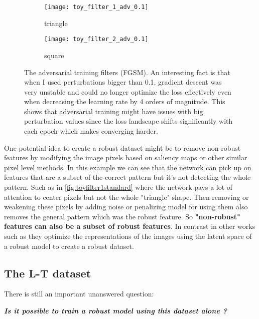 \documentclass[../thesis.tex]{subfiles}
\begin{document}
	\begin{figure}[h!]
		\centering
		\begin{subfigure}{.5\textwidth}
			\centering
			\texttt{[image: toy\_filter\_1\_adv\_0.1]}
			\caption{triangle}
			\label{fig:toyfilter1adv0}
		\end{subfigure}%
		\begin{subfigure}{.5\textwidth}
			\centering
			\texttt{[image: toy\_filter\_2\_adv\_0.1]}
			\caption{square}
			\label{fig:toyfilter2adv0}
		\end{subfigure}
		\caption{The adversarial training filters (FGSM). An interesting fact is that when I used perturbations bigger than 0.1, gradient descent was very unstable and could no longer optimize the loss effectively even when decreasing the learning rate by 4 orders of magnitude. This shows that adversarial training might have issues with big perturbation values since the loss landscape shifts significantly with each epoch which makes converging harder.}
		\label{fig:toy_adv_training_filters}
	\end{figure}
	
	
	One potential idea to create a robust dataset might be to remove non-robust features by modifying the image pixels based on saliency maps or other similar pixel level methods. In this example we can see that the network can pick up on features that are a subset of the correct pattern but it's not detecting the whole pattern. Such as in \ref{fig:toyfilter1standard} where the network pays a lot of attention to center pixels but not the whole "triangle" shape. Then removing or weakening these pixels by adding noise or penalizing model for using them also removes the general pattern which was the robust feature. So \textbf{"non-robust" features can also be a subset of robust features}. In contrast in other works such as \cite{adv_training_madry} they optimize the representations of the images using the latent space of a robust model to create a robust dataset.    
	
	
	\subsection{The L-T dataset}
	
	There is still an important unanswered question: 
	
	\begin{center}
		\textit{\textbf{Is it possible to train a robust model using this dataset alone ?}}
	\end{center}
	
\end{document}
